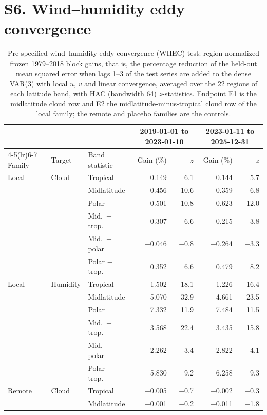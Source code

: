 \documentclass[11pt]{article}
\begin{document}
\section*{S6. Wind--humidity eddy convergence}

\begin{table}[htbp]
\centering
\caption{Pre-specified wind--humidity eddy convergence (WHEC) test: region-normalized frozen 1979--2018 block gains, that is, the percentage reduction of the held-out mean squared error when lags 1--3 of the test series are added to the dense VAR(3) with local $u$, $v$ and linear convergence, averaged over the 22 regions of each latitude band, with HAC (bandwidth 64) $z$-statistics. Endpoint E1 is the midlatitude cloud row and E2 the midlatitude-minus-tropical cloud row of the local family; the remote and placebo families are the controls.}
\label{tab:s16}
\scriptsize
\begin{tabular}{@{}lllrrrr@{}}
\toprule
& & & \multicolumn{2}{c}{2019-01-01 to 2023-01-10} & \multicolumn{2}{c}{2023-01-11 to 2025-12-31} \\
\cmidrule(lr){4-5}\cmidrule(lr){6-7}
Family & Target & Band statistic & Gain (\%) & $z$ & Gain (\%) & $z$ \\
\midrule
Local & Cloud & Tropical & 0.149 & 6.1 & 0.144 & 5.7 \\
 &  & Midlatitude & 0.456 & 10.6 & 0.359 & 6.8 \\
 &  & Polar & 0.501 & 10.8 & 0.623 & 12.0 \\
 &  & Mid.\ $-$ trop. & 0.307 & 6.6 & 0.215 & 3.8 \\
 &  & Mid.\ $-$ polar & $-$0.046 & $-$0.8 & $-$0.264 & $-$3.3 \\
 &  & Polar $-$ trop. & 0.352 & 6.6 & 0.479 & 8.2 \\
\addlinespace[2pt]
Local & Humidity & Tropical & 1.502 & 18.1 & 1.226 & 16.4 \\
 &  & Midlatitude & 5.070 & 32.9 & 4.661 & 23.5 \\
 &  & Polar & 7.332 & 11.9 & 7.484 & 11.5 \\
 &  & Mid.\ $-$ trop. & 3.568 & 22.4 & 3.435 & 15.8 \\
 &  & Mid.\ $-$ polar & $-$2.262 & $-$3.4 & $-$2.822 & $-$4.1 \\
 &  & Polar $-$ trop. & 5.830 & 9.2 & 6.258 & 9.3 \\
\addlinespace[2pt]
Remote & Cloud & Tropical & $-$0.005 & $-$0.7 & $-$0.002 & $-$0.3 \\
 &  & Midlatitude & $-$0.001 & $-$0.2 & $-$0.011 & $-$1.8 \\

\end{tabular}
\end{table}
\end{document}

